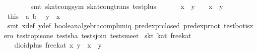 \begin{isabellebody}
\ \ \ \ \ \ \isamarkupfalse%
\ {}smt\ skat{}cong{}sym\ skat{}cong{}trans\ test{}plus{}\isanewline
\ \ \isamarkupfalse%
\isanewline
\ \ \isamarkupfalse%
\ {}x\ {}\ y\ {}\ {}{}\ \ {}x\ {}\ y\ {}\ {}{}\isanewline
\ \ \isamarkupfalse%
\ this\ \ a\ b\ \isamarkupfalse%
\ {}y\ {}\ {}x{}\isanewline
\ \ \ \ \isamarkupfalse%
\ {}smt\ x{}{}def\ y{}{}def\ boolean{}algebra{}compl{}uniq\ pred{}expr{}closed\ pred{}expr{}not\ test{}bot{}is{}zero\ test{}top{}is{}one\ tests{}ba\ tests{}join\ tests{}meet{}\isanewline
{}\isamarkupfalse%
%
\endisatagproof
{\isafoldproof}%
%
\isadelimproof
\isanewline
%
\endisadelimproof
\isanewline
{}\isamarkupfalse%
\ skt{}\ kat\ free{}kat\isanewline
\ \ \ {}dioid{}plus\ free{}kat\ x\ y\ {}\ x\ {}\ y{}\isanewline

\end{isabellebody}
